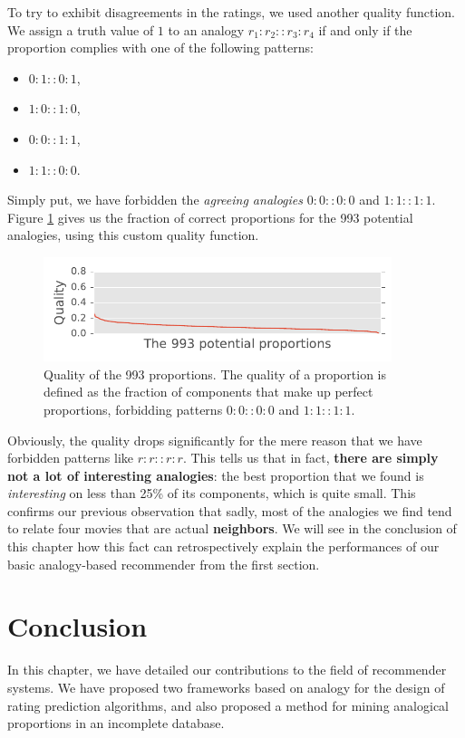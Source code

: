 To try to exhibit disagreements in the ratings, we used another quality
function. We assign a truth value of $1$ to an analogy $r_1:r_2::r_3:r_4$ if
and only if the proportion complies with one of the following patterns:
\begin{itemize}
  \item $0:1::0:1$,
  \item $1:0::1:0$,
  \item $0:0::1:1$,
  \item $1:1::0:0$.
\end{itemize}
Simply put, we have forbidden the \textit{agreeing analogies} $0:0::0:0$ and
$1:1::1:1$. Figure \ref{FIG:quality_proportions_different_ab_cd} gives us the
fraction of correct proportions for the 993 potential analogies, using this
custom quality function.
\begin{figure}[!h]
\centering
  \includegraphics[width=4in]{figures/quality_of_proportions_different.pdf}
  \caption{Quality of the 993 proportions. The quality of a
  proportion is defined as the fraction of components that make up perfect
  proportions, forbidding patterns $0:0::0:0$ and $1:1::1:1$.}
\label{FIG:quality_proportions_different_ab_cd}
\end{figure}
Obviously, the quality drops significantly for the mere reason that we have forbidden patterns
like $r:r::r:r$. This tells us that in fact, \textbf{there are simply not a lot of
interesting analogies}: the best proportion that we found is
\textit{interesting} on less than 25\% of its components, which is quite small.
This confirms our previous observation that sadly, most of the analogies we
find tend to relate four movies that are actual \textbf{neighbors}. We will see
in the conclusion of this chapter how this fact can retrospectively explain the
performances of our basic analogy-based recommender from the first section.

\section*{Conclusion}

In this chapter, we have detailed our contributions to the field of recommender
systems. We have proposed two frameworks based on analogy for the design of
rating prediction algorithms, and also proposed a method for mining analogical
proportions in an incomplete database.

